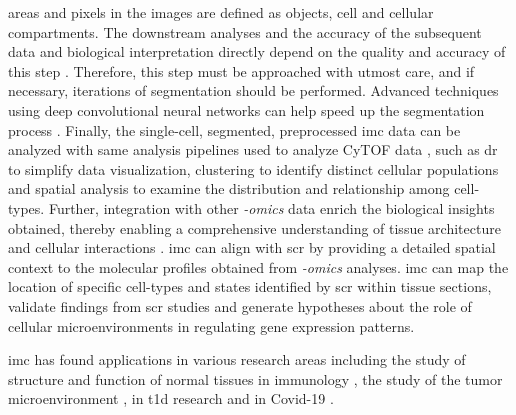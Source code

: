 areas and pixels in the images are defined as objects, cell and cellular compartments. The downstream analyses and the accuracy of the subsequent data and biological interpretation directly depend on the quality and accuracy of this step \textbf{\cite{milosevic_different_2023}}. Therefore, this step must be approached with utmost care, and if necessary, iterations of segmentation should be performed. Advanced techniques using deep convolutional neural networks can help speed up the segmentation process \textbf{\cite{jung_automatic_2019,fujita_cell_2021}}. %
Finally, the single-cell, segmented, preprocessed \gls{imc} data can be analyzed with same analysis pipelines used to analyze CyTOF data \textbf{\cite{veenstra_research_2021}}, such as \gls{dr} to simplify data visualization, clustering to identify distinct cellular populations and spatial analysis to examine the distribution and relationship among cell-types. Further, integration with other \textit{-omics} data enrich the biological insights obtained, thereby enabling a comprehensive understanding of tissue architecture and cellular interactions \textbf{\cite{veenstra_research_2021}}. \gls{imc} can align with \gls{scr} by providing a detailed spatial context to the molecular profiles obtained from \textit{-omics} analyses. \gls{imc} can map the location of specific cell-types and states identified by \gls{scr} within tissue sections, validate findings from \gls{scr} studies and generate hypotheses about the role of cellular microenvironments in regulating gene expression patterns.\\
\par \gls{imc} has found applications in various research areas including the study of structure and function of normal tissues \textbf{\cite{chang_imaging_2017}} in immunology \textbf{\cite{zhao_spatiotemporal_2018,li_memory_2019}}, the study of the tumor microenvironment \textbf{\cite{jackson_single-cell_2020,moldoveanu_spatially_2022}}, in \gls{t1d} research \textbf{\cite{damond_map_2019,wang_multiplexed_2019}} and in Covid-19 \textbf{\cite{wang_imaging_2020}}. 




